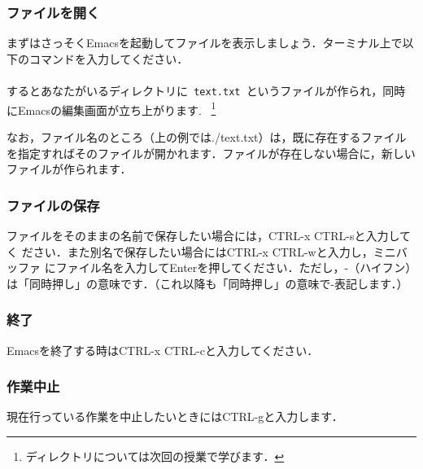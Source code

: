 \documentclass{jarticle}
\begin{document}


\subsubsection{ファイルを開く}
まずはさっそくEmacsを起動してファイルを表示しましょう．ターミナル上で以下のコマンドを入力してください．\\
\quad \quad {}\\
するとあなたがいるディレクトリに\verb| text.txt |というファイルが作られ，同時にEmacsの編集画面が立ち上がります. \ \footnote{ディレクトリについては次回の授業で学びます．}

なお，ファイル名のところ（上の例では./text.txt）は，既に存在するファイルを指定すればそのファイルが開かれます．ファイルが存在しない場合に，新しいファイルが作られます．

\subsubsection{ファイルの保存}
ファイルをそのままの名前で保存したい場合には，CTRL-x CTRL-sと入力してく
ださい．また別名で保存したい場合にはCTRL-x CTRL-wと入力し，ミニバッファ
にファイル名を入力してEnterを押してください．ただし，-（ハイフン）は「同時押し」の意味です．（これ以降も「同時押し」の意味で-表記します．）

\subsubsection{終了}
Emacsを終了する時はCTRL-x CTRL-cと入力してください．

\subsubsection{作業中止}
現在行っている作業を中止したいときにはCTRL-gと入力します．
\end{document}
